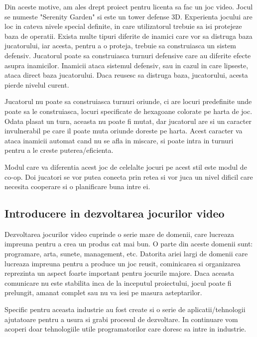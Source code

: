 \documentclass[12pt, a4paper]{article}
\begin{document}
	Din aceste motive, am ales drept proiect pentru licenta sa fac un joc video. Jocul se numeste "Serenity Garden" si este un tower defense 3D. Experienta jocului are loc in cateva nivele special definite, in care utilizatorul trebuie sa isi protejeze baza de operatii. Exista multe tipuri diferite de inamici care vor sa distruga baza jucatorului, iar acesta, pentru a o proteja, trebuie sa construiasca un sistem defensiv. Jucatorul poate sa construiasca turnuri defensive care au diferite efecte asupra inamicilor. Inamicii ataca sistemul defensiv, sau in cazul in care lipseste, ataca direct baza jucatorului. Daca reusesc sa distruga baza, jucatorului, acesta pierde nivelul curent.
	\newline
	
	Jucatorul nu poate sa construiasca turnuri oriunde, ci are locuri predefinite unde poate sa le construiasca, locuri specificate de hexagoane colorate pe harta de joc. Odata plasat un turn, aceasta nu poate fi mutat, dar jucatorul are si un caracter invulnerabil pe care il poate muta oriunde doreste pe harta. Acest caracter va ataca inamicii automat cand nu se afla in miscare, si poate intra in turnuri pentru a le creste puterea/eficienta.
	\newline
	
	Modul care va diferentia acest joc de celelalte jocuri pe acest stil este modul de co-op. Doi jucatori se vor putea conecta prin retea si vor juca un nivel dificil care necesita cooperare si o planificare buna intre ei.
	
	
	
	
	
	\subsection{Introducere in dezvoltarea jocurilor video}
	
	Dezvoltarea jocurilor video cuprinde o serie mare de domenii, care lucreaza impreuna pentru a crea un produs cat mai bun. O parte din aceste domenii sunt: programare, arta, sunete, management, etc. Datorita ariei largi de domenii care lucreaza impreuna pentru a produce un joc reusit, cominicarea si organizarea reprezinta un aspect foarte important pentru jocurile majore. Daca aceasta comunicare nu este stabilita inca de la inceputul proiectului, jocul poate fi prelungit, amanat complet sau nu va iesi pe masura asteptarilor.
	\newline
	
	Specific pentru aceasta industrie au fost create si o serie de aplicatii/tehnologii ajutatoare pentru a usura si grabi procesul de dezvoltare. In continuare vom acoperi doar tehnologiile utile programatorilor care doresc sa intre in industrie.
	\newline
	
\end{document}
